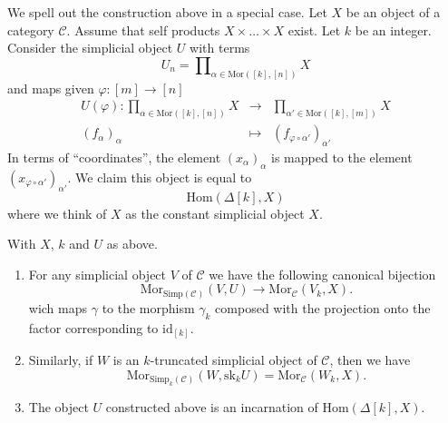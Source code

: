 \noindent
We spell out the construction above in a special case.
Let $X$ be an object of a category $\mathcal{C}$.
Assume that self products $X \times \ldots \times X$ exist.
Let $k$ be an integer.
Consider the simplicial object $U$ with terms
$$
U_n = \prod\nolimits_{\alpha \in \text{Mor}([k], [n])} X
$$
and maps given $\varphi : [m] \to [n]$ 
\begin{eqnarray*}
U(\varphi) :
\prod\nolimits_{\alpha \in \text{Mor}([k], [n])} X
& \longrightarrow &
\prod\nolimits_{\alpha' \in \text{Mor}([k], [m])} X \\
(f_{\alpha})_{\alpha} & \longmapsto & 
(f_{\varphi \circ \alpha'})_{\alpha'}
\end{eqnarray*}
In terms of ``coordinates'', the element $(x_\alpha)_\alpha$
is mapped to the element $(x_{\varphi \circ \alpha'})_{\alpha'}$.
We claim this object is equal to
$$
\text{Hom}(\Delta[k], X)
$$
where we think of $X$ as the constant simplicial object $X$.

\begin{lemma}
\label{lemma-morphism-into-product}
With $X$, $k$ and $U$ as above.
\begin{enumerate}
\item For any simplicial object $V$ of
$\mathcal{C}$ we have the following
canonical bijection
$$
\text{Mor}_{\text{Simp}(\mathcal{C})}(V, U)
\longrightarrow
\text{Mor}_{\mathcal{C}}(V_k, X).
$$
wich maps $\gamma$ to the morphism $\gamma_k$ composed with
the projection onto the factor corresponding to $\text{id}_{[k]}$.
\item Similarly, if $W$ is an $k$-truncated simplicial object
of $\mathcal{C}$, then we have
$$
\text{Mor}_{\text{Simp}_k(\mathcal{C})}(W, \text{sk}_k U)
=
\text{Mor}_{\mathcal{C}}(W_k, X).
$$
\item The object $U$ constructed above is an
incarnation of $\text{Hom}(\Delta[k], X)$.
\end{enumerate}
\end{lemma}

